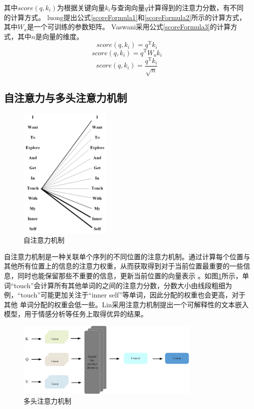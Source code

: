 其中$score(q,k_i)$为根据关键向量$k_i$与查询向量$q$计算得到的注意力分数，有不同的计算方式。
luong提出公式\ref{scoreFormula1}和\ref{scoreFormula2}所示的计算方式，其中$W_a$是一个可训练的参数矩阵。
Vaswani采用公式\ref{scoreFormula3}的计算方式，其中$n$是向量的维度。
\begin{equation}\label{scoreFormula1}
	score(q,k_i)=q^\mathrm{T}k_i
\end{equation}
\begin{equation}\label{scoreFormula2}
	score(q,k_i)=q^\mathrm{T}W_ak_i
\end{equation}
\begin{equation}\label{scoreFormula3}
	score(q,k_i)=\frac{q^\mathrm{T}k_i}{\sqrt{n}}
\end{equation}
\subsection{自注意力与多头注意力机制}

\begin{figure}[htb]%
	\setlength{\belowcaptionskip}{0pt}
	\centering
	\includegraphics[width=0.4\textwidth]{pic/2-11.png}
	\caption{自注意力机制}
	\label{self-att}
\end{figure}
自注意力机制是一种关联单个序列的不同位置的注意力机制。通过计算每个位置与其他所有位置上的信息的注意力权重，从而获取得到对于当前位置最重要的一些信息，同时也能保留那些不重要的信息，更新当前位置的向量表示
。如图\ref{self-att}所示，单词“touch”会计算所有其他单词的之间的注意力分数，分数大小由线段粗细为例，“touch”可能更加关注于“inner self”等单词，因此分配的权重也会更高，对于其他
单词分配的权重会低一些。Lin采用注意力机制提出一个可解释性的文本嵌入模型，用于情感分析等任务上取得优异的结果。
\begin{figure}[htb]%
	\setlength{\belowcaptionskip}{0pt}
	\centering
	\includegraphics[width=0.8\textwidth]{pic/2-12.png}
	\caption{多头注意力机制}
	\label{muti-att}
\end{figure}

